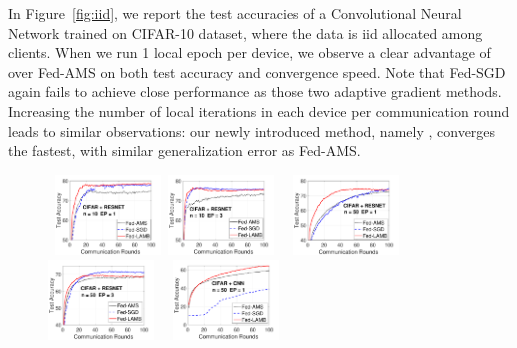 \documentclass[twoside]{article}
\begin{document}
In Figure~\ref{fig:iid}, we report the test accuracies of a Convolutional Neural Network trained on CIFAR-10 dataset, where the data is iid allocated among clients.
When we run 1 local epoch per device, we observe a clear advantage of \algo over Fed-AMS on both test accuracy and convergence speed.
Note that Fed-SGD again fails to achieve close performance as those two adaptive gradient methods. 
Increasing the number of local iterations in each device per communication round leads to similar observations: our newly introduced method, namely \algo, converges the fastest, with similar generalization error as Fed-AMS. 

\begin{figure}[t]
    \begin{center}
        \mbox{
        \includegraphics[width=0.25\textwidth]{new_figure/cifar_testerror_resnet_ep1_client10_iid1_SGD.pdf}
         \includegraphics[width=0.25\textwidth]{new_figure/cifar_testerror_resnet_ep3_client10_iid1_SGD.pdf}
        }
                \mbox{
                \includegraphics[width=0.25\textwidth]{new_figure/cifar_testerror_resnet_ep1_client50_iid1_SGD.pdf}
                        \includegraphics[width=0.25\textwidth]{new_figure/cifar_testerror_resnet_ep3_client50_iid1_SGD.pdf}
                        }
                \mbox{        
                                \includegraphics[width=0.25\textwidth]{new_figure/cifar_testerror_cnn_ep1_client50_iid1.pdf}
}
\end{center}
\end{figure}
\end{document}
